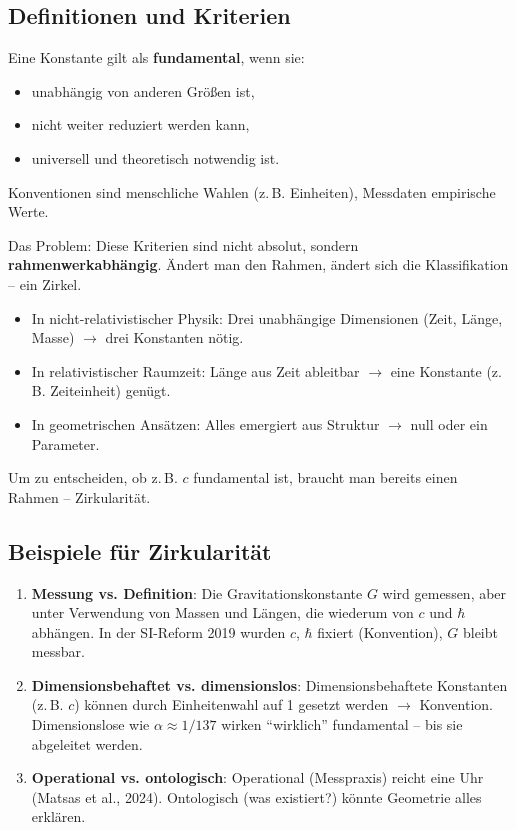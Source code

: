 	\subsection{Definitionen und Kriterien}
	
	Eine Konstante gilt als \textbf{fundamental}, wenn sie:
	\begin{itemize}
		\item unabhängig von anderen Größen ist,
		\item nicht weiter reduziert werden kann,
		\item universell und theoretisch notwendig ist.
	\end{itemize}
	
	Konventionen sind menschliche Wahlen (z.\,B. Einheiten), Messdaten empirische Werte.
	
	Das Problem: Diese Kriterien sind nicht absolut, sondern \textbf{rahmenwerkabhängig}. Ändert man den Rahmen, ändert sich die Klassifikation – ein Zirkel.
	
	\begin{itemize}
		\item In nicht-relativistischer Physik: Drei unabhängige Dimensionen (Zeit, Länge, Masse) $\to$ drei Konstanten nötig.
		\item In relativistischer Raumzeit: Länge aus Zeit ableitbar $\to$ eine Konstante (z.\,B. Zeiteinheit) genügt.
		\item In geometrischen Ansätzen: Alles emergiert aus Struktur $\to$ null oder ein Parameter.
	\end{itemize}
	
	Um zu entscheiden, ob z.\,B. $c$ fundamental ist, braucht man bereits einen Rahmen – Zirkularität.
	
	\subsection{Beispiele für Zirkularität}
	
	\begin{enumerate}
		\item \textbf{Messung vs. Definition}: Die Gravitationskonstante $G$ wird gemessen, aber unter Verwendung von Massen und Längen, die wiederum von $c$ und $\hbar$ abhängen. In der SI-Reform 2019 wurden $c$, $\hbar$ fixiert (Konvention), $G$ bleibt messbar.
		\item \textbf{Dimensionsbehaftet vs. dimensionslos}: Dimensionsbehaftete Konstanten (z.\,B. $c$) können durch Einheitenwahl auf 1 gesetzt werden $\to$ Konvention. Dimensionslose wie $\alpha \approx 1/137$ wirken ``wirklich'' fundamental – bis sie abgeleitet werden.
		\item \textbf{Operational vs. ontologisch}: Operational (Messpraxis) reicht eine Uhr (Matsas et al., 2024). Ontologisch (was existiert?) könnte Geometrie alles erklären.
	\end{enumerate}
	
